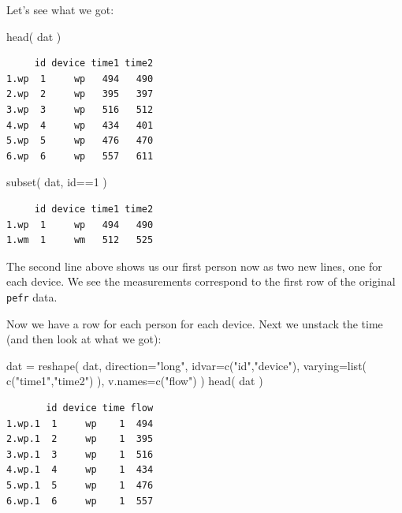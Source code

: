 \documentclass[
  letterpaper,
  DIV=11,
  numbers=noendperiod]{scrreprt}
\newenvironment{Shaded}{\begin{snugshade}}{\end{snugshade}}
\newcommand{\AttributeTok}[1]{\textcolor[rgb]{0.49,0.56,0.16}{#1}}
\newcommand{\DecValTok}[1]{\textcolor[rgb]{0.25,0.63,0.44}{#1}}
\newcommand{\FunctionTok}[1]{\textcolor[rgb]{0.02,0.16,0.49}{#1}}
\newcommand{\NormalTok}[1]{\textcolor[rgb]{0.00,0.44,0.13}{#1}}
\newcommand{\OtherTok}[1]{\textcolor[rgb]{0.00,0.44,0.13}{#1}}
\newcommand{\SpecialCharTok}[1]{\textcolor[rgb]{0.25,0.44,0.63}{#1}}
\newcommand{\StringTok}[1]{\textcolor[rgb]{0.25,0.44,0.63}{#1}}
\begin{document}
Let's see what we got:

\begin{Shaded}
\begin{Highlighting}[]
\FunctionTok{head}\NormalTok{( dat )}
\end{Highlighting}
\end{Shaded}

\begin{verbatim}
     id device time1 time2
1.wp  1     wp   494   490
2.wp  2     wp   395   397
3.wp  3     wp   516   512
4.wp  4     wp   434   401
5.wp  5     wp   476   470
6.wp  6     wp   557   611
\end{verbatim}

\begin{Shaded}
\begin{Highlighting}[]
\FunctionTok{subset}\NormalTok{( dat, id}\SpecialCharTok{==}\DecValTok{1}\NormalTok{ )}
\end{Highlighting}
\end{Shaded}

\begin{verbatim}
     id device time1 time2
1.wp  1     wp   494   490
1.wm  1     wm   512   525
\end{verbatim}

The second line above shows us our first person now as two new lines,
one for each device. We see the measurements correspond to the first row
of the original \texttt{pefr} data.

Now we have a row for each person for each device. Next we unstack the
time (and then look at what we got):

\begin{Shaded}
\begin{Highlighting}[]
\NormalTok{dat }\OtherTok{=} \FunctionTok{reshape}\NormalTok{( dat, }\AttributeTok{direction=}\StringTok{"long"}\NormalTok{, }\AttributeTok{idvar=}\FunctionTok{c}\NormalTok{(}\StringTok{"id"}\NormalTok{,}\StringTok{"device"}\NormalTok{),}
               \AttributeTok{varying=}\FunctionTok{list}\NormalTok{( }\FunctionTok{c}\NormalTok{(}\StringTok{"time1"}\NormalTok{,}\StringTok{"time2"}\NormalTok{) ),}
               \AttributeTok{v.names=}\FunctionTok{c}\NormalTok{(}\StringTok{"flow"}\NormalTok{) )}
\FunctionTok{head}\NormalTok{( dat )}
\end{Highlighting}
\end{Shaded}

\begin{verbatim}
       id device time flow
1.wp.1  1     wp    1  494
2.wp.1  2     wp    1  395
3.wp.1  3     wp    1  516
4.wp.1  4     wp    1  434
5.wp.1  5     wp    1  476
6.wp.1  6     wp    1  557
\end{verbatim}
\end{document}

